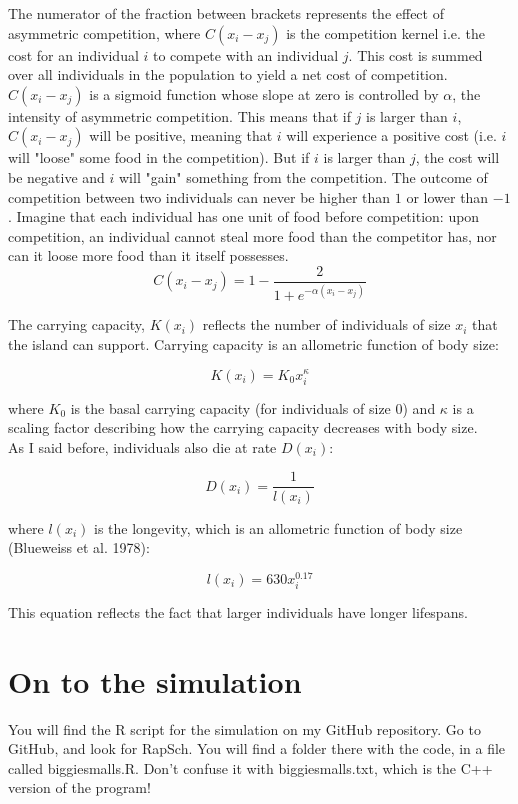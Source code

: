 \documentclass[12pt]{article}
\begin{document}
The numerator of the fraction between brackets represents the effect of asymmetric competition, where $C(x_i - x_j)$ is the competition kernel i.e. the cost for an individual $i$ to compete with an individual $j$. This cost is summed over all individuals in the population to yield a net cost of competition. $C(x_i - x_j)$ is a sigmoid function whose slope at zero is controlled by $\alpha$, the intensity of asymmetric competition. This means that if $j$ is larger than $i$, $C(x_i - x_j)$ will be positive, meaning that $i$ will experience a positive cost (i.e. $i$ will "loose" some food in the competition). But if $i$ is larger than $j$, the cost will be negative and $i$ will "gain" something from the competition. The outcome of competition between two individuals can never be higher than $1$ or lower than $-1$. Imagine that each individual has one unit of food before competition: upon competition, an individual cannot steal more food than the competitor has, nor can it loose more food than it itself possesses.\\

\[
C(x_i - x_j) = 1 - \frac{2}{1 + e^{-\alpha (x_i - x_j)}}
\]

The carrying capacity, $K(x_i)$ reflects the number of individuals of size $x_i$ that the island can support. Carrying capacity is an allometric function of body size:

\[
K(x_i) = K_0 x_i ^\kappa
\]

where $K_0$ is the basal carrying capacity (for individuals of size $0$) and $\kappa$ is a scaling factor describing how the carrying capacity decreases with body size.\\

As I said before, individuals also die at rate $D(x_i)$:

\[
D(x_i) = \frac{1}{l(x_i)}
\]

where $l(x_i)$ is the longevity, which is an allometric function of body size (Blueweiss et al. 1978):

\[
l(x_i) = 630 x_i^{0.17}
\]

This equation reflects the fact that larger individuals have longer lifespans.

\section{On to the simulation}

You will find the R script for the simulation on my GitHub repository. Go to GitHub, and look for RapSch. You will find a folder there with the code, in a file called biggiesmalls.R. Don't confuse it with biggiesmalls.txt, which is the C++ version of the program!\\
\end{document}
